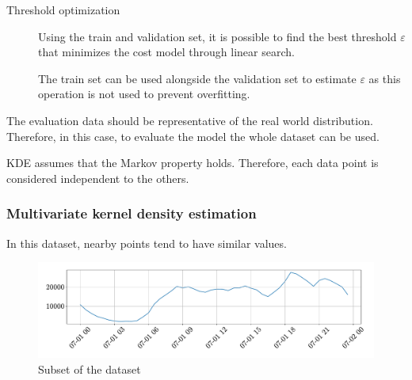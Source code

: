 \begin{description}
    \item[Threshold optimization]
        Using the train and validation set, it is possible to find the best threshold $\varepsilon$ that minimizes the cost model through linear search.

        \begin{remark}
            The train set can be used alongside the validation set to estimate $\varepsilon$ as this operation is not used to prevent overfitting.
        \end{remark}
\end{description}

\begin{remark}
    The evaluation data should be representative of the real world distribution. Therefore, in this case, to evaluate the model the whole dataset can be used.
\end{remark}

\begin{remark}
    KDE assumes that the Markov property holds. Therefore, each data point is considered independent to the others.
\end{remark}


\subsubsection{Multivariate kernel density estimation} \label{sec:ad_taxi_kde_multi}

\begin{remark}
    In this dataset, nearby points tend to have similar values.
    \begin{figure}[H]
        \centering
        \includegraphics[width=0.7\linewidth]{./img/_ad_taxi_subset.pdf}
        \caption{Subset of the dataset}
    \end{figure}
\end{remark}

